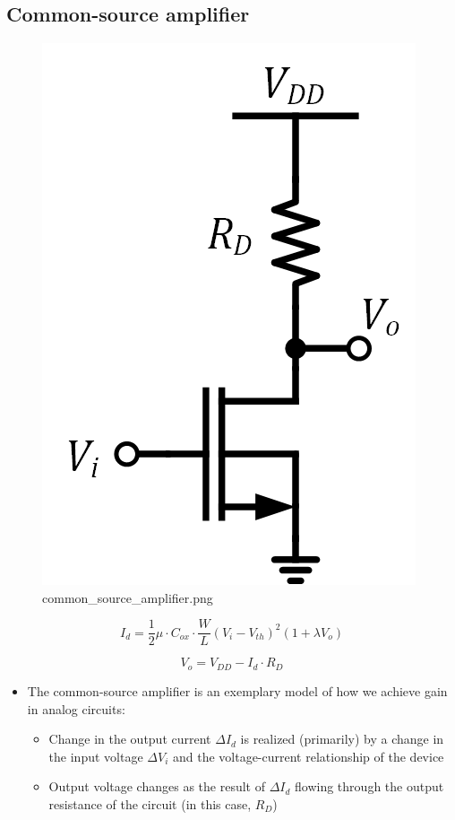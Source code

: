 \documentclass[11pt]{article}
\providecommand{\tightlist}{%
      \setlength{\itemsep}{0pt}\setlength{\parskip}{0pt}}
\begin{document}
    \hypertarget{common-source-amplifier}{%
\subsection{Common-source amplifier}\label{common-source-amplifier}}

    \begin{figure}
\centering
\includegraphics{common_source_amplifier.png}
\caption{common\_source\_amplifier.png}
\end{figure}

    \begin{equation}
I_d = \dfrac{1}{2}\mu\cdot C_{ox} \cdot \dfrac{W}{L}(V_{i}-V_{th})^2 (1+\lambda V_{o})
\end{equation}

\begin{equation}
V_o = V_{DD} - I_d\cdot R_D
\end{equation}

    \begin{itemize}
\tightlist
\item
  The common-source amplifier is an exemplary model of how we achieve
  gain in analog circuits:

  \begin{itemize}
  \tightlist
  \item
    Change in the output current \(\Delta I_d\) is realized (primarily)
    by a change in the input voltage \(\Delta V_i\) and the
    voltage-current relationship of the device
  \item
    Output voltage changes as the result of \(\Delta I_d\) flowing
    through the output resistance of the circuit (in this case, \(R_D\))
  \end{itemize}
\end{itemize}
\end{document}
